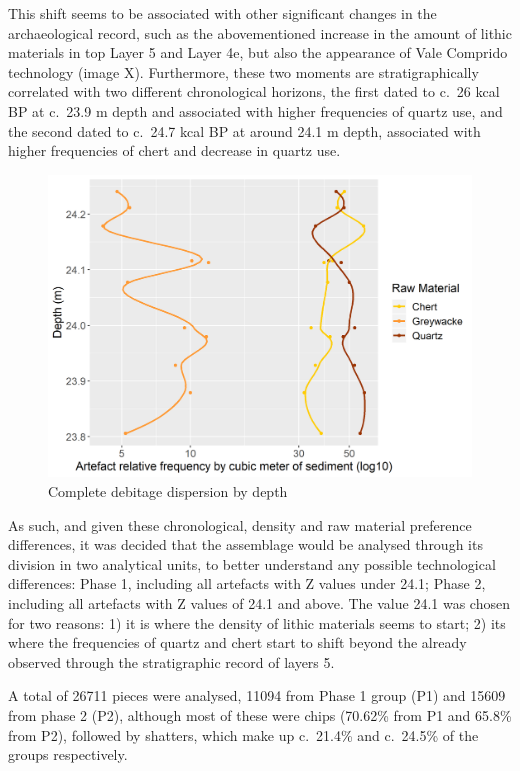\documentclass[12pt,twoside]{reedthesis}
\begin{document}
This shift seems to be associated with other significant changes in the archaeological record, such as the abovementioned increase in the amount of lithic materials in top Layer 5 and Layer 4e, but also the appearance of Vale Comprido technology (image X). Furthermore, these two moments are stratigraphically correlated with two different chronological horizons, the first dated to c.~26 kcal BP at c.~23.9 m depth and associated with higher frequencies of quartz use, and the second dated to c.~24.7 kcal BP at around 24.1 m depth, associated with higher frequencies of chert and decrease in quartz use.
\begin{figure}
\includegraphics[width=1\linewidth]{figure/rm_cubic_meter} \caption{Complete debitage dispersion by depth}\label{fig:unnamed-chunk-12}
\end{figure}
As such, and given these chronological, density and raw material preference differences, it was decided that the assemblage would be analysed through its division in two analytical units, to better understand any possible technological differences: Phase 1, including all artefacts with Z values under 24.1; Phase 2, including all artefacts with Z values of 24.1 and above. The value 24.1 was chosen for two reasons: 1) it is where the density of lithic materials seems to start; 2) its where the frequencies of quartz and chert start to shift beyond the already observed through the stratigraphic record of layers 5.

A total of 26711 pieces were analysed, 11094 from Phase 1 group (P1) and 15609 from phase 2 (P2), although most of these were chips (70.62\% from P1 and 65.8\% from P2), followed by shatters, which make up c.~21.4\% and c.~24.5\% of the groups respectively.
\end{document}
